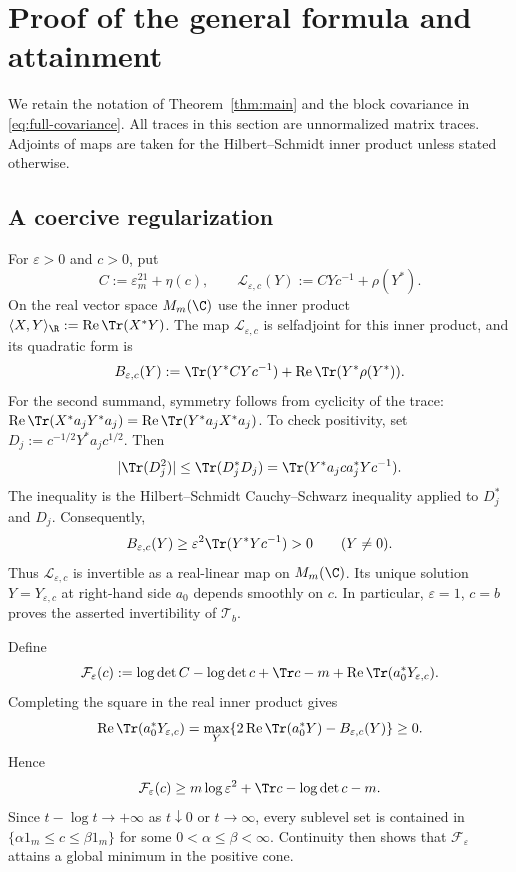 \section{Proof of the general formula and attainment}\label{sec:main-proof}

We retain the notation of Theorem~\ref{thm:main} and the block covariance in \eqref{eq:full-covariance}.
All traces in this section are unnormalized matrix traces.
Adjoints of maps are taken for the Hilbert--Schmidt inner product unless stated otherwise.

\subsection{A coercive regularization}
For $\varepsilon>0$ and $c>0$, put
\[
 C:=\varepsilon^21_m+\eta(c),\qquad
 \mathcal L_{\varepsilon,c}(Y):=CYc^{-1}+\rho(Y^*).
\]
On the real vector space $M_m(\C)$ use the inner product $\langle X,Y\rangle_{\R}:=\operatorname{Re}\Tr(X^*Y)$.
The map $\mathcal L_{\varepsilon,c}$ is selfadjoint for this inner product, and its quadratic form is
\begin{equation}\label{eq:quadratic-form}
 B_{\varepsilon,c}(Y):=\Tr(Y^*CYc^{-1})
             +\operatorname{Re}\Tr(Y^*\rho(Y^*)).
\end{equation}
For the second summand, symmetry follows from cyclicity of the trace:
$\operatorname{Re}\Tr(X^*a_jY^*a_j) =\operatorname{Re}\Tr(Y^*a_jX^*a_j)$.
To check positivity, set $D_j:=c^{-1/2}Y^*a_jc^{1/2}$.
Then
\[
 |\Tr(D_j^2)|\le\Tr(D_j^*D_j)
      =\Tr(Y^*a_jca_j^*Yc^{-1}).
\]
The inequality is the Hilbert--Schmidt Cauchy--Schwarz inequality applied to $D_j^*$ and $D_j$.
Consequently,
\begin{equation}\label{eq:quadratic-lower-bound}
 B_{\varepsilon,c}(Y)\ge
           \varepsilon^2\Tr(Y^*Yc^{-1})>0\qquad(Y\ne0).
\end{equation}
Thus $\mathcal L_{\varepsilon,c}$ is invertible as a real-linear map on $M_m(\C)$.
Its unique solution $Y=Y_{\varepsilon,c}$ at right-hand side $a_0$ depends smoothly on $c$.
In particular, $\varepsilon=1$, $c=b$ proves the asserted invertibility of $\mathcal T_b$.

Define
\begin{equation}\label{eq:regularized-objective}
 \mathcal F_\varepsilon(c):=\log\det C-\log\det c
       +\Tr c-m+\operatorname{Re}\Tr(a_0^*Y_{\varepsilon,c}).
\end{equation}
Completing the square in the real inner product gives
\begin{equation}\label{eq:inner-maximum}
 \operatorname{Re}\Tr(a_0^*Y_{\varepsilon,c})
 =\max_Y\{2\operatorname{Re}\Tr(a_0^*Y)-B_{\varepsilon,c}(Y)\}
 \ge0.
\end{equation}
Hence
\[
 \mathcal F_\varepsilon(c)\ge
 m\log\varepsilon^2+\Tr c-\log\det c-m.
\]
Since $t-\log t\to+\infty$ as $t\downarrow0$ or $t\to\infty$, every sublevel set is contained in $\{\alpha 1_m\le c\le\beta 1_m\}$ for some $0<\alpha\le\beta<\infty$.
Continuity then shows that $\mathcal F_\varepsilon$ attains a global minimum in the positive cone.

